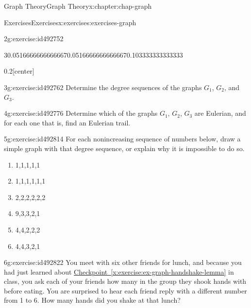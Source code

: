 \documentclass[oneside,10pt,]{book}
\newcommand{\xreffont}{\relax}
\numberwithin{equation}{section}
\begin{document}
\begin{chapterptx}{Graph Theory}{}{Graph Theory}{}{}{x:chapter:chap-graph}
\begin{exercises-section}{Exercises}{}{Exercises}{}{}{x:exercises:exercises-graph}
\begin{divisionexercise}{2}{}{}{g:exercise:id492752}
\begin{sidebyside}{3}{0.0516666666666667}{0.0516666666666667}{0.103333333333333}
\begin{sbspanel}{0.2}[center]
{
}%
\end{sbspanel}%
\end{sidebyside}%
\end{divisionexercise}%
\begin{divisionexercise}{3}{}{}{g:exercise:id492762}%
Determine the degree sequences of the graphs \(G_1\), \(G_2\), and \(G_3\).%
\end{divisionexercise}%
\begin{divisionexercise}{4}{}{}{g:exercise:id492776}%
Determine which of the graphs \(G_1\), \(G_2\), \(G_3\) are Eulerian, and for each one that is, find an Eulerian trail.%
\end{divisionexercise}%
\begin{divisionexercise}{5}{}{}{g:exercise:id492814}%
For each nonincreasing sequence of numbers below, draw a simple graph with that degree sequence, or explain why it is impossible to do so.%
\begin{enumerate}[label=(\alph*)]
\item{}1,1,1,1,1%
\item{}1,1,1,1,1,1%
\item{}2,2,2,2,2,2%
\item{}9,3,3,2,1%
\item{}4,4,2,2,2%
\item{}4,4,3,2,1%
\end{enumerate}
%
\end{divisionexercise}%
\begin{divisionexercise}{6}{}{}{g:exercise:id492822}%
You meet with six other friends for lunch, and because you had just learned about \hyperref[x:exercise:ex-graph-handshake-lemma]{Checkpoint~{\xreffont\ref{x:exercise:ex-graph-handshake-lemma}}} in class, you ask each of your friends how many in the group they shook hands with before eating. You are surprised to hear each friend reply with a different number from 1 to 6. How many hands did you shake at that lunch?%

\end{divisionexercise}
\end{exercises-section}
\end{chapterptx}
\end{document}
